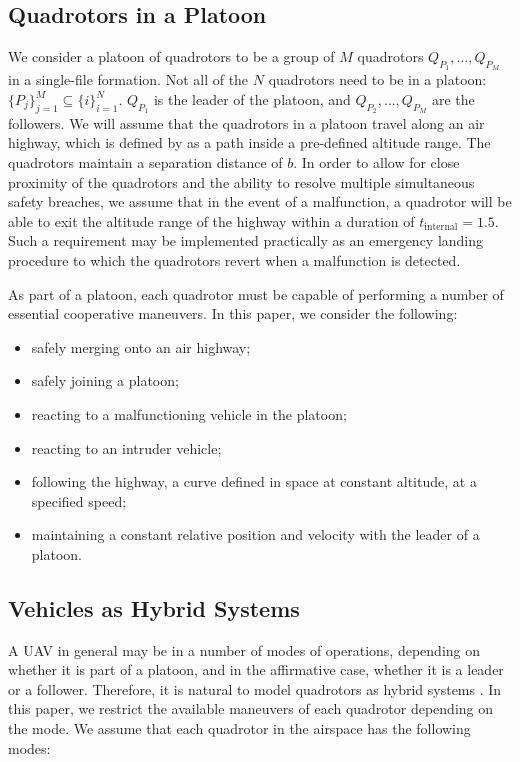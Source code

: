 \subsection{Quadrotors in a Platoon\label{subsec:platoon_def}}
We consider a platoon of quadrotors to be a group of $M$ quadrotors $Q_{P_1}, \ldots, Q_{P_M}$ in a single-file formation. Not all of the $N$ quadrotors need to be in a platoon: $\{P_j\}_{j=1}^M \subseteq \{i\}_{i=1}^N$. $Q_{P_1}$ is the leader of the platoon, and $Q_{P_2},\ldots,Q_{P_M}$ are the followers. We will assume that the quadrotors in a platoon travel along an air highway, which is defined by as a path inside a pre-defined altitude range. The quadrotors maintain a separation distance of $b$. In order to allow for close proximity of the quadrotors and the ability to resolve multiple simultaneous safety breaches, we assume that in the event of a malfunction, a quadrotor will be able to exit the altitude range of the highway within a duration of $t_\text{internal}=1.5$. Such a requirement may be implemented practically as an emergency landing procedure to which the quadrotors revert when a malfunction is detected.

As part of a platoon, each quadrotor must be capable of performing a number of essential cooperative maneuvers. In this paper, we consider the following: 
\begin{itemize}
\item safely merging onto an air highway;
\item safely joining a platoon;
\item reacting to a malfunctioning vehicle in the platoon;
\item reacting to an intruder vehicle;
\item following the highway, a curve defined in space at constant altitude, at a specified speed;
\item maintaining a constant relative position and velocity with the leader of a platoon.
\end{itemize}

\subsection{Vehicles as Hybrid Systems}
A UAV in general may be in a number of modes of operations, depending on whether it is part of a platoon, and in the affirmative case, whether it is a leader or a follower. Therefore, it is natural to model quadrotors as hybrid systems \cite{Lygeros98,Lygeros12}. In this paper, we restrict the available maneuvers of each quadrotor depending on the mode. We assume that each quadrotor in the airspace has the following modes:

